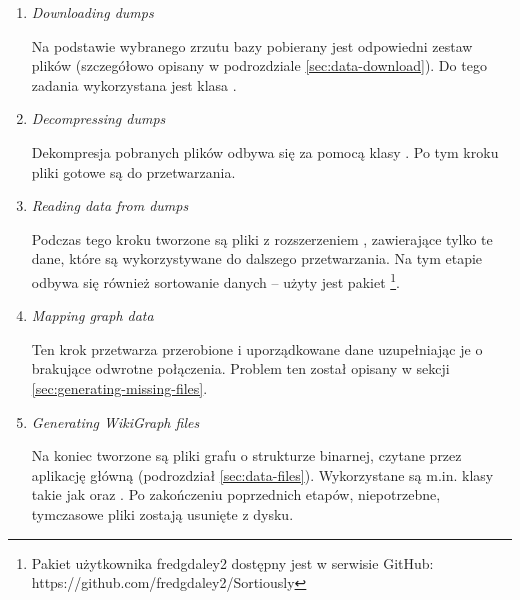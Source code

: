 \begin{enumerate}[label=\textbullet]
    \item \textit{Downloading dumps}

    Na podstawie wybranego zrzutu bazy pobierany jest odpowiedni zestaw plików (szczegółowo opisany w podrozdziale \ref{sec:data-download}). Do tego zadania wykorzystana jest klasa .

    \item \textit{Decompressing dumps}

    Dekompresja pobranych plików odbywa się za pomocą klasy . Po tym kroku pliki  gotowe są do przetwarzania.

    \item \textit{Reading data from dumps}

    Podczas tego kroku tworzone są pliki z rozszerzeniem , zawierające tylko te dane, które są wykorzystywane do dalszego przetwarzania. Na tym etapie odbywa się również sortowanie danych – użyty jest pakiet \footnote{Pakiet użytkownika fredgdaley2 dostępny jest w serwisie GitHub: https://github.com/fredgdaley2/Sortiously}.

    \item \textit{Mapping graph data}

    Ten krok przetwarza przerobione i uporządkowane dane uzupełniając je o brakujące odwrotne połączenia. Problem ten został opisany w sekcji \ref{sec:generating-missing-files}.

    \item \textit{Generating WikiGraph files}	

    Na koniec tworzone są pliki grafu o strukturze binarnej, czytane przez aplikację główną (podrozdział \ref{sec:data-files}). Wykorzystane są m.in. klasy takie jak  oraz . Po zakończeniu poprzednich etapów, niepotrzebne, tymczasowe pliki zostają usunięte z dysku.

\end{enumerate}